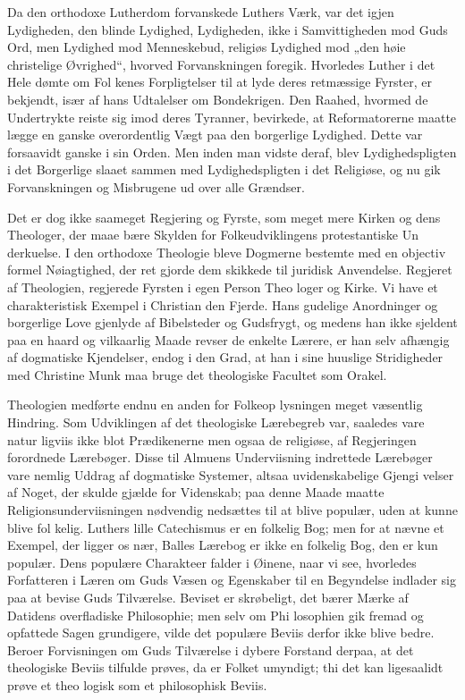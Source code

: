 \documentclass[12pt]{book}
\newcommand{\opage}[1]{\marginnote{\footnotesize\textit{[#1]}}}
\begin{document}
Da den orthodoxe Lutherdom forvanskede Luthers
Værk, var det igjen Lydigheden, den blinde Lydighed,
Lydigheden, ikke i Samvittigheden mod Guds Ord, men
Lydighed mod Menneskebud, religiøs Lydighed mod
„den høie christelige Øvrighed“, hvorved Forvanskningen
foregik. Hvorledes Luther i det Hele dømte om Fol\-%
kenes Forpligtelser til at lyde deres retmæssige Fyrster,
er bekjendt, især af hans Udtalelser om Bondekrigen.
Den Raahed, hvormed de Undertrykte reiste sig imod
deres Tyranner, bevirkede, at Reformatorerne maatte
\opage{127}\setcounter{footnote}{0}%
lægge en ganske overordentlig Vægt paa den borgerlige
Lydighed. Dette var forsaavidt ganske i sin Orden.
Men inden man vidste deraf, blev Lydighedspligten i
det Borgerlige slaaet sammen med Lydighedspligten i
det Religiøse, og nu gik Forvanskningen og Misbrugene
ud over alle Grændser.

Det er dog ikke saameget Regjering og Fyrste,
som meget mere Kirken og dens Theologer, der maae
bære Skylden for Folkeudviklingens protestantiske Un\-%
derkuelse. I den orthodoxe Theologie bleve Dogmerne
bestemte med en objectiv formel Nøiagtighed, der ret
gjorde dem skikkede til juridisk Anvendelse. Regjeret
af Theologien, regjerede Fyrsten i egen Person Theo\-%
loger og Kirke. Vi have et charakteristisk Exempel i
Christian den Fjerde. Hans gudelige Anordninger og
borgerlige Love gjenlyde af Bibelsteder og Gudsfrygt,
og medens han ikke sjeldent paa en haard og vilkaarlig
Maade revser de enkelte Lærere, er han selv afhængig
af dogmatiske Kjendelser, endog i den Grad, at han i
sine huuslige Stridigheder med Christine Munk maa
bruge det theologiske Facultet som Orakel.

Theologien medførte endnu en anden for Folkeop\-%
lysningen meget væsentlig Hindring. Som Udviklingen
af det theologiske Lærebegreb var, saaledes vare natur\-%
ligviis ikke blot Prædikenerne men ogsaa de religiøse,
af Regjeringen forordnede Lærebøger. Disse til Almuens
Underviisning indrettede Lærebøger vare nemlig Uddrag
af dogmatiske Systemer, altsaa uvidenskabelige Gjengi\-%
velser af Noget, der skulde gjælde for Videnskab; paa
denne Maade maatte Religionsunderviisningen nødvendig
nedsættes til at blive populær, uden at kunne blive fol\-%
kelig. Luthers lille Catechismus er en folkelig Bog;
men for at nævne et Exempel, der ligger os nær, Balles
Lærebog er ikke en folkelig Bog, den er kun populær.
\opage{128}\setcounter{footnote}{0}%
Dens populære Charakteer falder i Øinene, naar vi
see, hvorledes Forfatteren i Læren om Guds Væsen og
Egenskaber til en Begyndelse indlader sig paa at bevise
Guds Tilværelse. Beviset er skrøbeligt, det bærer Mærke
af Datidens overfladiske Philosophie; men selv om Phi\-%
losophien gik fremad og opfattede Sagen grundigere, vilde
det populære Beviis derfor ikke blive bedre. Beroer
Forvisningen om Guds Tilværelse i dybere Forstand
derpaa, at det theologiske Beviis tilfulde prøves, da er
Folket umyndigt; thi det kan ligesaalidt prøve et theo\-%
logisk som et philosophisk Beviis.
\end{document}
